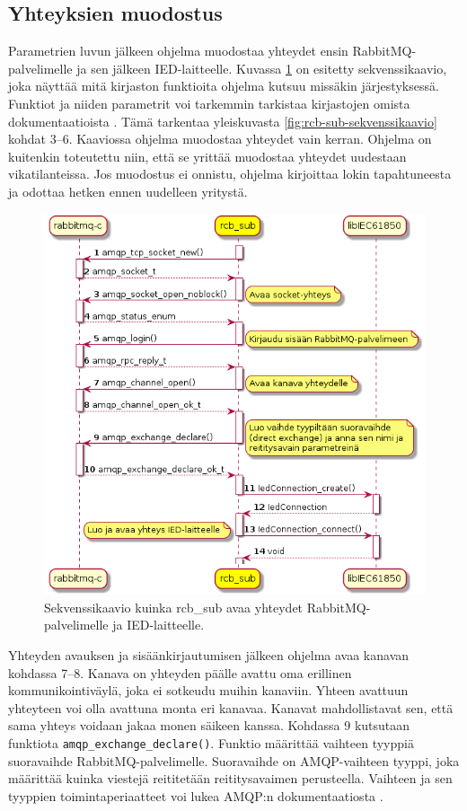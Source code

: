 \subsection{Yhteyksien muodostus}
Parametrien luvun jälkeen ohjelma muodostaa yhteydet ensin RabbitMQ-palvelimelle ja sen jälkeen IED-laitteelle. Kuvassa \ref{fig:rcb-sub-open-connections} on esitetty sekvenssikaavio, joka näyttää mitä kirjaston funktioita ohjelma kutsuu missäkin järjestyksessä. Funktiot ja niiden parametrit voi tarkemmin tarkistaa kirjastojen omista dokumentaatioista \cite{libIEC61850-doc} \cite{rabbitmq-c-repo}. Tämä tarkentaa yleiskuvasta \ref{fig:rcb-sub-sekvenssikaavio} kohdat 3--6. Kaaviossa ohjelma muodostaa yhteydet vain kerran. Ohjelma on kuitenkin toteutettu niin, että se yrittää muodostaa yhteydet uudestaan vikatilanteissa. Jos muodostus ei onnistu, ohjelma kirjoittaa lokin tapahtuneesta ja odottaa hetken ennen uudelleen yritystä.

\begin{figure}[ht!]
	\includegraphics[width=1\textwidth]{pictures/rcb-sub-open-connections.png}
	\caption{Sekvenssikaavio kuinka rcb\_sub avaa yhteydet RabbitMQ-palvelimelle ja IED-laitteelle.}
	\label{fig:rcb-sub-open-connections}
\end{figure}

Yhteyden avauksen ja sisäänkirjautumisen jälkeen ohjelma avaa kanavan kohdassa 7--8. Kanava on yhteyden päälle avattu oma erillinen kommunikointiväylä, joka ei sotkeudu muihin kanaviin. Yhteen avattuun yhteyteen voi olla avattuna monta eri kanavaa. Kanavat mahdollistavat sen, että sama yhteys voidaan jakaa monen säikeen kanssa. Kohdassa 9 kutsutaan funktiota \texttt{amqp\_exchange\_declare()}. Funktio määrittää vaihteen tyyppiä suoravaihde RabbitMQ-palvelimelle. Suoravaihde on AMQP-vaihteen tyyppi, joka määrittää kuinka viestejä reititetään reititysavaimen perusteella. Vaihteen ja sen tyyppien toimintaperiaatteet voi lukea AMQP:n dokumentaatiosta \cite[s.~26--28]{AMQP-specification}.


